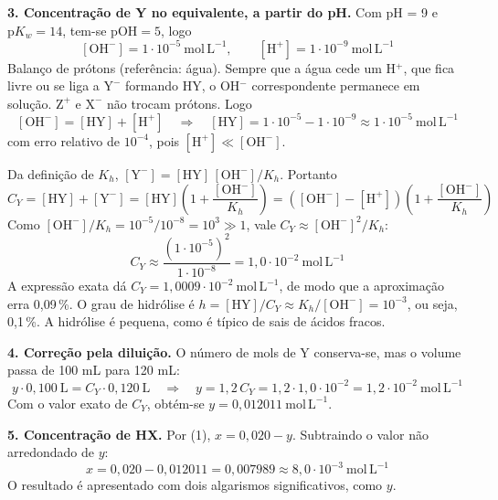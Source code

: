\documentclass{article}%
\begin{document}
\textbf{3. Concentração de Y no equivalente, a partir do pH.} Com pH = 9 e $\mathrm{p}K_w = 14$, tem-se $\mathrm{pOH} = 5$, logo
\[
[\mathrm{OH^-}] = 1\cdot10^{-5}\ \mathrm{mol\,L^{-1}}, \qquad [\mathrm{H^+}] = 1\cdot10^{-9}\ \mathrm{mol\,L^{-1}}
\]
Balanço de prótons (referência: água). Sempre que a água cede um H$^+$, que fica livre ou se liga a $\mathrm{Y^-}$ formando HY, o OH$^-$ correspondente permanece em solução. $\mathrm{Z^+}$ e $\mathrm{X^-}$ não trocam prótons. Logo
\[
[\mathrm{OH^-}] = [\mathrm{HY}] + [\mathrm{H^+}] \quad\Rightarrow\quad [\mathrm{HY}] = 1\cdot10^{-5} - 1\cdot10^{-9} \approx 1\cdot10^{-5}\ \mathrm{mol\,L^{-1}}
\]
com erro relativo de $10^{-4}$, pois $[\mathrm{H^+}] \ll [\mathrm{OH^-}]$.

Da definição de $K_h$, $[\mathrm{Y^-}] = [\mathrm{HY}]\,[\mathrm{OH^-}]/K_h$. Portanto
\[
C_Y = [\mathrm{HY}] + [\mathrm{Y^-}] = [\mathrm{HY}]\left(1 + \frac{[\mathrm{OH^-}]}{K_h}\right) = \left([\mathrm{OH^-}] - [\mathrm{H^+}]\right)\left(1 + \frac{[\mathrm{OH^-}]}{K_h}\right)
\]
Como $[\mathrm{OH^-}]/K_h = 10^{-5}/10^{-8} = 10^{3} \gg 1$, vale $C_Y \approx [\mathrm{OH^-}]^2/K_h$:
\[
C_Y \approx \frac{(1\cdot10^{-5})^2}{1\cdot10^{-8}} = 1{,}0\cdot10^{-2}\ \mathrm{mol\,L^{-1}}
\]
A expressão exata dá $C_Y = 1{,}0009\cdot10^{-2}\ \mathrm{mol\,L^{-1}}$, de modo que a aproximação erra 0,09\,\%. O grau de hidrólise é $h = [\mathrm{HY}]/C_Y \approx K_h/[\mathrm{OH^-}] = 10^{-3}$, ou seja, 0,1\,\%. A hidrólise é pequena, como é típico de sais de ácidos fracos.

\textbf{4. Correção pela diluição.} O número de mols de Y conserva-se, mas o volume passa de 100 mL para 120 mL:
\[
y \cdot 0{,}100\ \mathrm{L} = C_Y \cdot 0{,}120\ \mathrm{L} \quad\Rightarrow\quad y = 1{,}2\,C_Y = 1{,}2\cdot1{,}0\cdot10^{-2} = 1{,}2\cdot10^{-2}\ \mathrm{mol\,L^{-1}}
\]
Com o valor exato de $C_Y$, obtém-se $y = 0{,}012011\ \mathrm{mol\,L^{-1}}$.

\textbf{5. Concentração de HX.} Por (1), $x = 0{,}020 - y$. Subtraindo o valor não arredondado de $y$:
\[
x = 0{,}020 - 0{,}012011 = 0{,}007989 \approx 8{,}0\cdot10^{-3}\ \mathrm{mol\,L^{-1}}
\]
O resultado é apresentado com dois algarismos significativos, como $y$.
\end{document}
